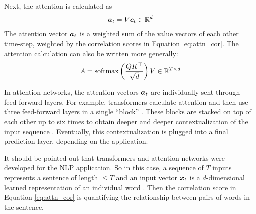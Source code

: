 Next, the attention is calculated as 
\begin{equation}
  \boldsymbol{a}_t = V \boldsymbol{c}_t \in \mathbb{R}^d
  \label{eq:attn}
\end{equation}
The attention vector $\boldsymbol{a}_t$ is a weighted sum of the value vectors of each other time-step, weighted by the correlation scores in Equation \ref{eq:attn_cor}. The attention calculation can also be written more generally:
\begin{equation}
  A = \text{softmax}\left(\frac{QK^\top}{\sqrt{d}} \right) V \in \mathbb{R}^{T \times d}
  \label{eq:attn_matrix}
\end{equation}

In attention networks, the attention vectors $\boldsymbol{a}_t$ are individually sent through feed-forward layers. For example, transformers calculate attention and then use three feed-forward layers in a single ``block'' \cite{vaswani2017}. These blocks are stacked on top of each other up to six times to obtain deeper and deeper contextualization of the input sequence \cite{dai2019}. Eventually, this contextualization is plugged into a final prediction layer, depending on the application.

It should be pointed out that transformers and attention networks were developed for the NLP application. So in this case, a sequence of $T$ inputs represents a sentence of length $\leq T$ and an input vector $\boldsymbol{x}_t$ is a $d$-dimensional learned representation of an individual word \cite{mikolov2013}. Then the correlation score in Equation \ref{eq:attn_cor} is quantifying the relationship between pairs of words in the sentence.


